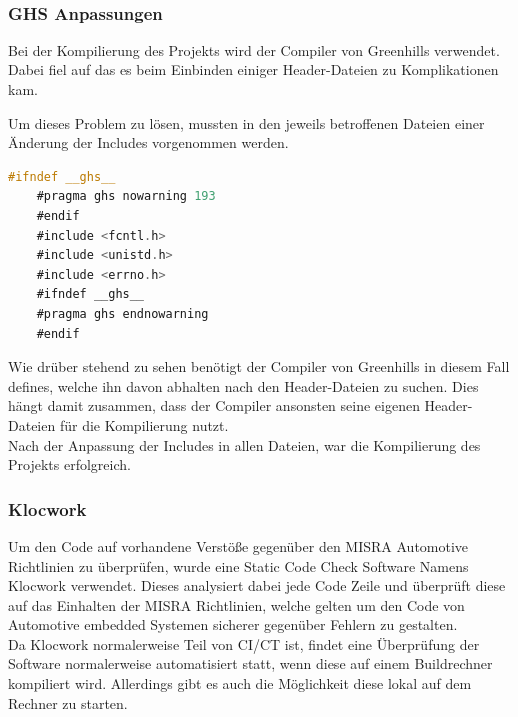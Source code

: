 

\begin{lstlisting}[language=bash]
	
\end{lstlisting}

\subsubsection{GHS Anpassungen}
Bei der Kompilierung des Projekts wird der Compiler von Greenhills verwendet.
Dabei fiel auf das es beim Einbinden einiger Header-Dateien zu Komplikationen kam.

Um dieses Problem zu lösen, mussten in den jeweils betroffenen Dateien einer Änderung der Includes vorgenommen werden.

\begin{lstlisting}[language=C]
	#ifndef __ghs__
	#pragma ghs nowarning 193
	#endif
	#include <fcntl.h>
	#include <unistd.h>
	#include <errno.h>
	#ifndef __ghs__
	#pragma ghs endnowarning
	#endif
\end{lstlisting}

Wie drüber stehend zu sehen benötigt der Compiler von Greenhills in diesem Fall defines,
welche ihn davon abhalten nach den Header-Dateien zu suchen.
Dies hängt damit zusammen, dass der Compiler ansonsten seine eigenen Header-Dateien für die Kompilierung nutzt.\\

Nach der Anpassung der Includes in allen Dateien, war die Kompilierung des Projekts erfolgreich.


\subsubsection{Klocwork}
Um den Code auf vorhandene Verstöße gegenüber den MISRA Automotive Richtlinien zu überprüfen,
wurde eine Static Code Check Software Namens Klocwork verwendet.
Dieses analysiert dabei jede Code Zeile und überprüft diese auf das Einhalten der MISRA Richtlinien,
welche gelten um den Code von Automotive embedded Systemen sicherer gegenüber Fehlern zu gestalten.\\

Da Klocwork normalerweise Teil von CI/CT ist, findet eine Überprüfung der Software normalerweise automatisiert statt,
wenn diese auf einem Buildrechner kompiliert wird.
Allerdings gibt es auch die Möglichkeit diese lokal auf dem Rechner zu starten.


